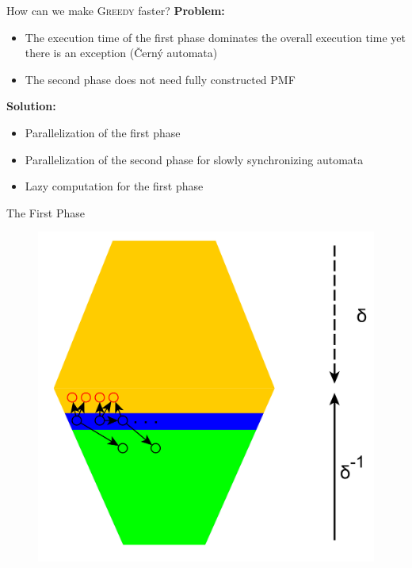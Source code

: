 \documentclass{beamer}
\begin{document}
\begin{frame}{How can we make \textsc{Greedy} faster?}
	\textbf{Problem:}	
	\begin{itemize}
		\item  The execution time of the first phase dominates the overall execution time yet there is an exception (\v{C}ern\'y automata)
		\item The second phase does not need fully constructed PMF
	\end{itemize}
	\textbf{Solution:}
	\begin{itemize}
		\item Parallelization of the first phase
		\item Parallelization of the second phase for slowly synchronizing automata
		\item Lazy computation for the first phase
	\end{itemize}
\end{frame}


\begin{frame}{The First Phase}

	\begin{figure}
		\includegraphics[height=\textheight]{figs/f2r.pdf}
	\end{figure}
\end{frame}
\end{document}
